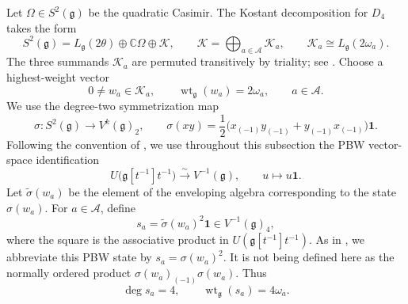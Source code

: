 \documentclass[11pt,reqno]{amsart}
\theoremstyle{definition}
\theoremstyle{remark}
\begin{document}
Let \(\Omega\in S^2(\mathfrak g)\) be the quadratic Casimir.  The
Kostant decomposition for \(D_4\) takes the form
\begin{equation*}
  S^2(\mathfrak g)
  =L_{\mathfrak g}(2\theta)
   \oplus\mathbb C\Omega
   \oplus\mathcal K,
  \qquad
  \mathcal K
  =\bigoplus_{a\in\mathcal A}\mathcal K_a,
  \qquad
  \mathcal K_a\cong L_{\mathfrak g}(2\omega_a).
\end{equation*}
The three summands \(\mathcal K_a\) are permuted transitively by
triality; see \cite[Section~2]{ArakawaMoreau2018}.  Choose a highest-weight vector
\begin{equation*}
  0\ne w_a\in\mathcal K_a,
  \qquad
  \operatorname{wt}_{\mathfrak g}(w_a)=2\omega_a,
  \qquad a\in\mathcal A.
\end{equation*}
We use the degree-two symmetrization map
\begin{equation*}
  \sigma:S^2(\mathfrak g)\longrightarrow V^k(\mathfrak g)_2,
  \qquad
  \sigma(xy)
  =\frac12\bigl(x_{(-1)}y_{(-1)}+y_{(-1)}x_{(-1)}\bigr)\mathbf1.
\end{equation*}
Following the convention of \cite[Section~4]{ArakawaMoreau2018}, we use
throughout this subsection the PBW vector-space identification
\begin{equation*}
  U\bigl(\mathfrak g[t^{-1}]t^{-1}\bigr)
  \xrightarrow{\sim}V^{-1}(\mathfrak g),
  \qquad u\longmapsto u\mathbf1.
\end{equation*}
Let \(\widetilde\sigma(w_a)\) be the element of the enveloping algebra
corresponding to the state \(\sigma(w_a)\).  For \(a\in\mathcal A\), define
\begin{equation*}
  s_a=\widetilde\sigma(w_a)^2\mathbf1
      \in V^{-1}(\mathfrak g)_4,
\end{equation*}
where the square is the associative product in
\(U(\mathfrak g[t^{-1}]t^{-1})\).  As in
\cite[Theorem~4.2(1)(b)]{ArakawaMoreau2018}, we abbreviate this PBW state
by \(s_a=\sigma(w_a)^2\).  It is not being defined here as the normally
ordered product \(\sigma(w_a)_{(-1)}\sigma(w_a)\).
Thus
\begin{equation*}
  \deg s_a=4,
  \qquad
  \operatorname{wt}_{\mathfrak g}(s_a)=4\omega_a.
\end{equation*}
\end{document}
